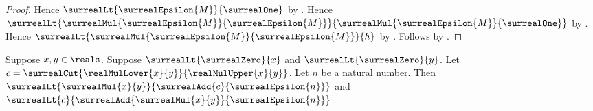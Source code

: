 \begin{proof}
    Hence $\surrealLt{\surrealEpsilon{M}}{\surrealOne}$
        by
        .
    Hence
        $\surrealLt
            {\surrealMul{\surrealEpsilon{M}}{\surrealEpsilon{M}}}
            {\surrealMul{\surrealEpsilon{M}}{\surrealOne}}$
        by
        .
    Hence
        $\surrealLt
            {\surrealMul{\surrealEpsilon{M}}{\surrealEpsilon{M}}}
            {h}$
        by
        .
    Follows by \auto.
\end{proof}

\begin{theorem}\label{positive_reals_product_cut_approximation}
    Suppose $x,y\in\reals$.
    Suppose $\surrealLt{\surrealZero}{x}$ and
        $\surrealLt{\surrealZero}{y}$.
    Let $c=\surrealCut{\realMulLower{x}{y}}{\realMulUpper{x}{y}}$.
    Let $n$ be a natural number.
    Then
        $\surrealLt{\surrealMul{x}{y}}
            {\surrealAdd{c}{\surrealEpsilon{n}}}$ and
        $\surrealLt{c}
            {\surrealAdd{\surrealMul{x}{y}}{\surrealEpsilon{n}}}$.
\end{theorem}
